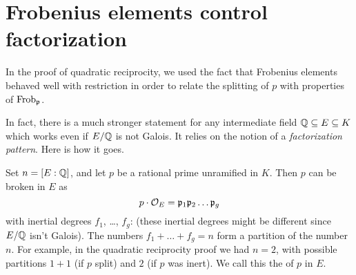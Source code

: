 \section{Frobenius elements control factorization}
In the proof of quadratic reciprocity, we used the fact that Frobenius elements behaved
well with restriction in order to relate the splitting of $p$ with properties of $\mathrm{Frob}_\mathfrak p$.

In fact, there is a much stronger statement for
any intermediate field $\mathbb Q \subseteq E \subseteq K$
which works even if $E/\mathbb Q$ is not Galois.
It relies on the notion of a \emph{factorization pattern}.
Here is how it goes.

Set $n = [E:\mathbb Q]$, and let $p$ be a rational prime unramified in $K$.
Then $p$ can be broken in $E$ as
\[ p \cdot \mathcal O_E = \mathfrak p_1 \mathfrak p_2 \dots \mathfrak p_g \]
with inertial degrees $f_1$, \dots, $f_g$:
(these inertial degrees might be different since $E/\mathbb Q$ isn't Galois).
The numbers $f_1 + \dots + f_g = n$ form a partition of the number $n$.
For example, in the quadratic reciprocity proof we had $n = 2$,
with possible partitions $1 + 1$ (if $p$ split) and $2$ (if $p$ was inert).
We call this the  of $p$ in $E$.

